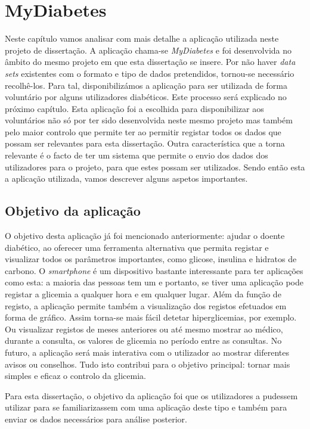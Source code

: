 \chapter{MyDiabetes}\label{chap:syst}

Neste capítulo vamos analisar com mais detalhe a aplicação utilizada neste projeto de dissertação. A aplicação chama-se \textit{MyDiabetes} e foi desenvolvida no âmbito do mesmo projeto em que esta dissertação se insere. 
Por não haver \textit{data sets} existentes com o formato e tipo de dados pretendidos, tornou-se necessário recolhê-los. Para tal, disponibilizámos a aplicação para ser utilizada de forma voluntário por alguns utilizadores diabéticos. Este processo será explicado no próximo capítulo.
Esta aplicação foi a escolhida para disponibilizar aos voluntários não só por ter sido desenvolvida neste mesmo projeto mas também pelo maior controlo que permite ter ao permitir registar todos os dados que possam ser relevantes para esta dissertação. 
Outra característica que a torna relevante é o facto de ter um sistema que permite o envio dos dados dos utilizadores para o projeto, para que estes possam ser utilizados. Sendo então esta a aplicação utilizada, vamos descrever alguns aspetos importantes.


\section{Objetivo da aplicação}

O objetivo desta aplicação já foi mencionado anteriormente: ajudar o doente diabético, ao oferecer uma ferramenta alternativa que permita registar e visualizar todos os parâmetros importantes, como glicose, insulina e hidratos de carbono. O \textit{smartphone} é um dispositivo bastante interessante para ter aplicações como esta: a maioria das pessoas tem um e portanto, se tiver uma aplicação pode registar a glicemia a qualquer hora e em qualquer lugar.
Além da função de registo, a aplicação permite também a visualização dos registos efetuados em forma de gráfico. Assim torna-se mais fácil detetar hiperglicemias, por exemplo. Ou visualizar registos de meses anteriores ou até mesmo mostrar ao médico, durante a consulta, os valores de glicemia no período entre as consultas.
No futuro, a aplicação será mais interativa com o utilizador ao mostrar diferentes avisos ou conselhos. Tudo isto contribui para o objetivo principal: tornar mais simples e eficaz o controlo da glicemia. 

Para esta dissertação, o objetivo da aplicação foi que os utilizadores a pudessem utilizar para se familiarizassem com uma aplicação deste tipo e também para enviar os dados necessários para análise posterior.

